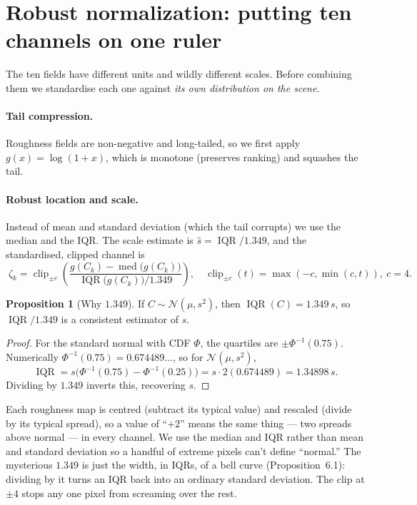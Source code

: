 \documentclass[11pt]{article}
\theoremstyle{definition}
\newtheorem{proposition}{Proposition}[section]
\newcommand{\med}{\operatorname{med}}
\newcommand{\IQR}{\operatorname{IQR}}
\newcommand{\clip}{\operatorname{clip}}
\begin{document}
\section{Robust normalization: putting ten channels on one ruler}

The ten fields have different units and wildly different scales. Before combining
them we standardise each one against \emph{its own distribution on the scene}.

\paragraph{Tail compression.} Roughness fields are non-negative and long-tailed, so
we first apply $g(x)=\log(1+x)$, which is monotone (preserves ranking) and squashes
the tail.

\paragraph{Robust location and scale.} Instead of mean and standard deviation
(which the tail corrupts) we use the median and the IQR. The scale estimate is
$\hat s = \IQR/1.349$, and the standardised, clipped channel is
\begin{equation}
\boxed{\;\zeta_k = \clip_{\pm c}\!\left(\frac{g(C_k)-\med\big(g(C_k)\big)}{\IQR\big(g(C_k)\big)/1.349}\right),\quad
\clip_{\pm c}(t)=\max(-c,\min(c,t)),\ c=4.\;}
\label{eq:zscore}
\end{equation}

\begin{proposition}[Why $1.349$]
If $C\sim\mathcal N(\mu,s^2)$, then $\IQR(C)=1.349\,s$, so $\IQR/1.349$ is a
consistent estimator of $s$.
\end{proposition}
\begin{proof}
For the standard normal with CDF $\Phi$, the quartiles are $\pm\Phi^{-1}(0.75)$.
Numerically $\Phi^{-1}(0.75)=0.674489\ldots$, so for $\mathcal N(\mu,s^2)$,
\[
\IQR = s\big(\Phi^{-1}(0.75)-\Phi^{-1}(0.25)\big)=s\cdot 2(0.674489)=1.34898\,s.
\]
Dividing by $1.349$ inverts this, recovering $s$. \qedhere
\end{proof}

\begin{words}
Each roughness map is centred (subtract its typical value) and rescaled (divide by
its typical spread), so a value of ``$+2$'' means the same thing --- two spreads
above normal --- in every channel. We use the median and IQR rather than mean and
standard deviation so a handful of extreme pixels can't define ``normal.'' The
mysterious $1.349$ is just the width, in IQRs, of a bell curve (Proposition~6.1):
dividing by it turns an IQR back into an ordinary standard deviation. The clip at
$\pm4$ stops any one pixel from screaming over the rest.
\end{words}
\end{document}
